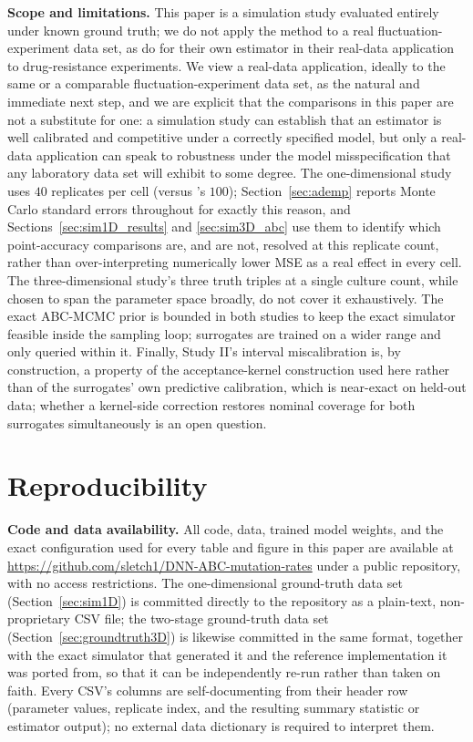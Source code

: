 \documentclass[sn-basic,iicol,pdflatex]{sn-jnl}
\begin{document}
\noindent\textbf{Scope and limitations.} This paper is a simulation study
evaluated entirely under known ground truth; we do not apply the method to a
real fluctuation-experiment data set, as \citet{lu2023} do for their own
estimator in their real-data application to drug-resistance experiments. We
view a real-data application, ideally to the same or a comparable
fluctuation-experiment data set, as the natural and immediate next step,
and we are explicit that the comparisons in this paper are not a substitute
for one: a simulation study can establish that an estimator is well
calibrated and competitive under a correctly specified model, but only a
real-data application can speak to robustness under the model misspecification
that any laboratory data set will exhibit to some degree. The
one-dimensional study uses $40$ replicates per cell (versus
\citeauthor{lu2023}'s $100$); Section~\ref{sec:ademp} reports Monte Carlo
standard errors throughout for exactly this reason, and
Sections~\ref{sec:sim1D_results} and \ref{sec:sim3D_abc} use them to
identify which point-accuracy comparisons are, and are not, resolved at
this replicate count, rather than over-interpreting numerically lower MSE
as a real effect in every cell. The three-dimensional study's three truth
triples at a single culture count, while chosen to span the parameter space
broadly, do not cover it exhaustively. The exact ABC-MCMC prior is bounded in both studies to keep
the exact simulator feasible inside the sampling loop; surrogates are
trained on a wider range and only queried within it. Finally,
Study II's interval miscalibration is, by construction, a property of the
acceptance-kernel construction used here rather than of the surrogates' own
predictive calibration, which is near-exact on held-out data; whether a
kernel-side correction restores nominal coverage for both surrogates
simultaneously is an open question.

\section{Reproducibility}
\label{sec:repro}

\noindent\textbf{Code and data availability.} All code, data, trained model
weights, and the exact configuration used for every table and figure in this
paper are available at
\url{https://github.com/sletch1/DNN-ABC-mutation-rates} under a public
repository, with no access restrictions. The one-dimensional ground-truth
data set (Section~\ref{sec:sim1D}) is committed directly to the repository
as a plain-text, non-proprietary CSV file; the two-stage ground-truth data set
(Section~\ref{sec:groundtruth3D}) is likewise committed in the same format,
together with the exact simulator that generated it and the reference
implementation it was ported from, so that it can be independently re-run
rather than taken on faith.
Every CSV's columns are self-documenting from their header row (parameter
values, replicate index, and the resulting summary statistic or estimator
output); no external data dictionary is required to interpret them.
\end{document}
